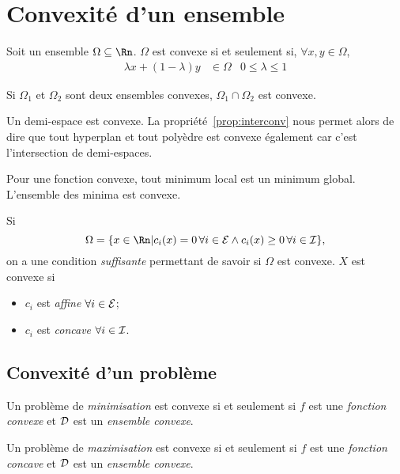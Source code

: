 \section{Convexité d'un ensemble}
\begin{mydef}
  Soit un ensemble $\Omega \subseteq \Rn$.
  $\Omega$ est convexe si et seulement si, $\forall x, y \in \Omega$,
  \begin{align*}
    \lambda x + (1-\lambda) y & \in \Omega & 0 \leq \lambda \leq 1
  \end{align*}
\end{mydef}
\begin{myprop}
  \label{prop:interconv}
  Si $\Omega_1$ et $\Omega_2$ sont deux ensembles convexes,
  $\Omega_1 \cap \Omega_2$ est convexe.
\end{myprop}
\begin{myprop}
  Un demi-espace est convexe.
  La propriété~\ref{prop:interconv} nous permet alors de dire que
  tout hyperplan et tout polyèdre est convexe également car c'est
  l'intersection de demi-espaces.
\end{myprop}
\begin{myprop}
  Pour une fonction convexe, tout minimum local est un minimum global.
  L'ensemble des minima est convexe.
\end{myprop}

\begin{myprop}
  Si
  \[ \Omega = \{x \in \Rn | c_i(x) = 0\,\forall i \in \eqset
  \land c_i(x) \geq 0\,\forall i \in \inset\}, \]
  on a une condition \emph{suffisante} permettant de savoir si $\Omega$ est
  convexe.
  $X$ est convexe si
  \begin{itemize}
    \item $c_i$ est \emph{affine} $\forall i \in \mathcal{E}$;
    \item $c_i$ est \emph{concave} $\forall i \in \mathcal{I}$.
  \end{itemize}
\end{myprop}

\subsection{Convexité d'un problème}
\begin{mydef}
  Un problème de \emph{minimisation} est convexe si et seulement si
  $f$ est une \emph{fonction convexe} et
  $\mathcal{D}$ est un \emph{ensemble convexe}.

  Un problème de \emph{maximisation} est convexe si et seulement si
  $f$ est une \emph{fonction concave} et
  $\mathcal{D}$ est un \emph{ensemble convexe}.
\end{mydef}

